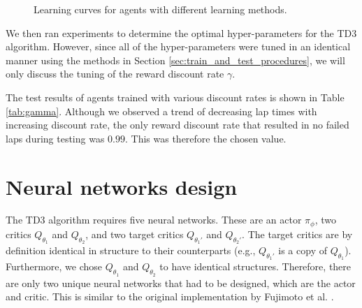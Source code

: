 \begin{figure}[htb!]
    \centering
    
    \caption[Learning curves showing for agents with different learning methods]{Learning curves for agents with different learning methods.}
    \label{fig:learning_method_reward}
\end{figure}

We then ran experiments to determine the optimal hyper-parameters for the TD3 algorithm.
However, since all of the hyper-parameters were tuned in an identical manner using the methods in Section \ref{sec:train_and_test_procedures}, we will only discuss the tuning of the reward discount rate $\gamma$. 



The test results of agents trained with various discount rates is shown in Table \ref{tab:gamma}.
Although we observed a trend of decreasing lap times with increasing discount rate, the only reward discount rate that resulted in no failed laps during testing was $0.99$. 
This was therefore the chosen value.



\section{Neural networks design}

The TD3 algorithm requires five neural networks. 
These are an actor $\pi_{\phi}$, two critics $Q_{\theta_{1}}$ and $Q_{\theta_{2}}$, and two target critics $Q_{\theta_{1}'}$ and $Q_{\theta_{2}'}$.
The target critics are by definition identical in structure to their counterparts (e.g., $Q_{\theta_{1}'}$ is a copy of $Q_{\theta_{1}}$).
Furthermore, we chose $Q_{\theta_{1}}$ and $Q_{\theta_{2}}$ to have identical structures.
Therefore, there are only two unique neural networks that had to be designed, which are the actor and critic.
This is similar to the original implementation by Fujimoto et al. \cite{Fujimoto2018}.

